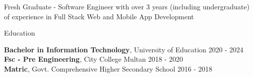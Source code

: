 \documentclass{resume} %
\begin{document}

\begin{rSection}%

{Fresh Graduate - Software Engineer with over 3 years (including undergraduate) of experience in Full Stack Web and Mobile App Development}


\end{rSection}

\begin{rSection}{Education}


{\bf Bachelor in Information Technology}, University of Education \hfill {2020 - 2024} 
\\
{\bf Fsc  - Pre Engineering}, City College Multan \hfill {2018 - 2020}
\\
{\bf Matric}, Govt. Comprehensive Higher Secondary School \hfill {2016 - 2018}


\end{rSection}
\end{document}
